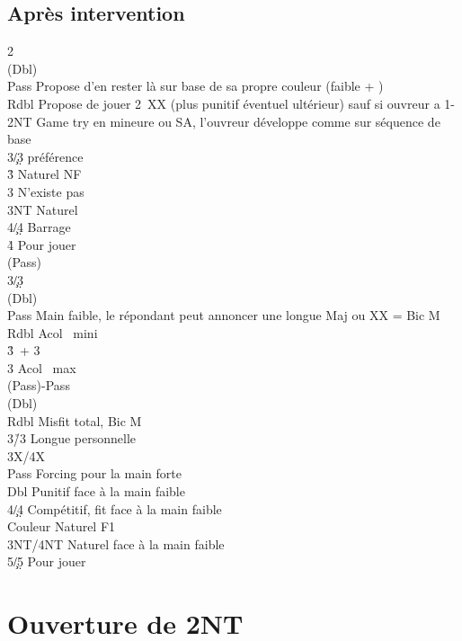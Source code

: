 \documentclass[a4paper]{article}
\begin{document}
\subsection{Après intervention}

\begin{bidtable}
2\s\+\\
(Dbl)\+\\
Pass \> Propose d'en rester là sur base de sa propre couleur (faible + \s )\\
Rdbl \> Propose de jouer 2\s\ XX (plus punitif éventuel ultérieur) sauf si ouvreur a 1- \s \\
2NT \> Game try en mineure ou SA, l'ouvreur développe comme sur séquence de base\\
3\c/3\d \> préférence\\
3\h \> Naturel NF\\
3\s \> N'existe pas\\
3NT \> Naturel\\
4\c/4\d \> Barrage\\
4\h \> Pour jouer\-\\
(Pass)\+\\
3\c/3\d\+\\
(Dbl)\+\\
Pass \> Main faible, le répondant peut annoncer une longue Maj ou XX = Bic M\\
Rdbl \> Acol \s\ mini\\
3\h {}\s\ + 3\h \\
3\s \> Acol \s\ max\-\\
(Pass)-Pass\+\\
(Dbl)\+\\
Rdbl \> Misfit total, Bic M\\
3\h/3\s \> Longue personnelle\-\-\-\-\\
3X/4X\+\\
Pass \> Forcing pour la main forte\\
Dbl \> Punitif face à la main faible\\
4\c/4\d \> Compétitif, fit face à la main faible\\
Couleur \> Naturel F1\\
3NT/4NT \> Naturel face à la main faible\\
5\c/5\d \> Pour jouer\-\-
\end{bidtable}

\section{Ouverture de 2NT}
\end{document}
